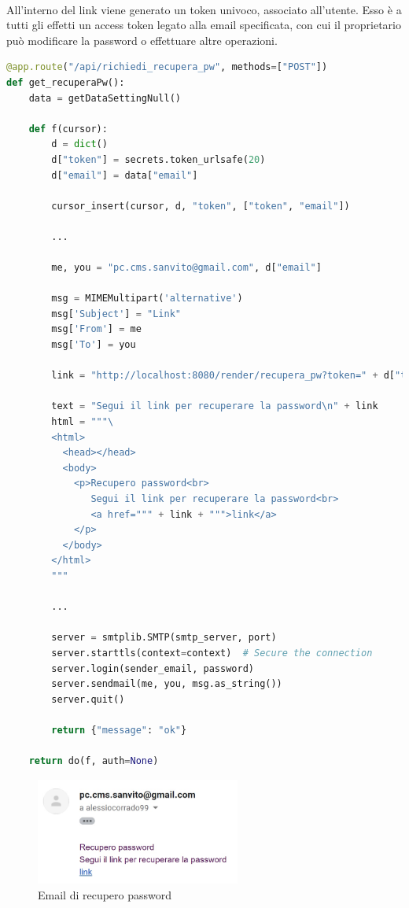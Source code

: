 \documentclass[11pt,a4paper,english]{article}
\begin{document}
\paragraph{} All'interno del link viene generato un token univoco, associato all'utente. Esso è a tutti gli effetti un access token legato alla email specificata, con cui il proprietario può modificare la password o effettuare altre operazioni.  

\begin{lstlisting}[language=Python, caption=endpoint richiedi_recupera_pw]
@app.route("/api/richiedi_recupera_pw", methods=["POST"])
def get_recuperaPw():
    data = getDataSettingNull()

    def f(cursor):
        d = dict()
        d["token"] = secrets.token_urlsafe(20)
        d["email"] = data["email"]

        cursor_insert(cursor, d, "token", ["token", "email"])
        
        ...

        me, you = "pc.cms.sanvito@gmail.com", d["email"]

        msg = MIMEMultipart('alternative')
        msg['Subject'] = "Link"
        msg['From'] = me
        msg['To'] = you

        link = "http://localhost:8080/render/recupera_pw?token=" + d["token"]

        text = "Segui il link per recuperare la password\n" + link
        html = """\
        <html>
          <head></head>
          <body>
            <p>Recupero password<br>
               Segui il link per recuperare la password<br>
               <a href=""" + link + """>link</a>
            </p>
          </body>
        </html>
        """

        ...

        server = smtplib.SMTP(smtp_server, port)
        server.starttls(context=context)  # Secure the connection
        server.login(sender_email, password)
        server.sendmail(me, you, msg.as_string())
        server.quit()

        return {"message": "ok"}

    return do(f, auth=None)
\end{lstlisting}


\begin{figure}[H]
    \centering
    \includegraphics[width=0.6\textwidth]{img/email_recupero.jpg}
    \caption{Email di recupero password}
\end{figure}
\end{document}
